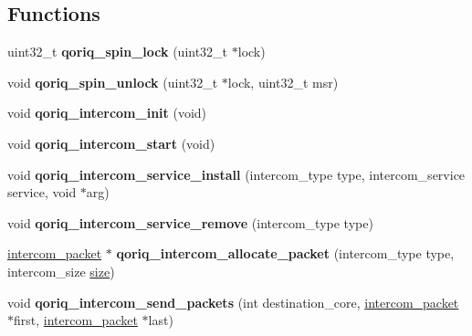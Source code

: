 \subsection*{Functions}
\begin{DoxyCompactItemize}
\item 
\mbox{\label{group__QorIQInterCom_ga1af84b5af84687eb679726fc4b89166a}} 
uint32\+\_\+t {\bfseries qoriq\+\_\+spin\+\_\+lock} (uint32\+\_\+t $\ast$lock)
\item 
\mbox{\label{group__QorIQInterCom_ga86c1e181120f331ec91fd7d7ebd5f613}} 
void {\bfseries qoriq\+\_\+spin\+\_\+unlock} (uint32\+\_\+t $\ast$lock, uint32\+\_\+t msr)
\item 
\mbox{\label{group__QorIQInterCom_ga2905c6a6aea938aab6dd83d9721a123b}} 
void {\bfseries qoriq\+\_\+intercom\+\_\+init} (void)
\item 
\mbox{\label{group__QorIQInterCom_ga5ba6d1c5d0dd9bcd7695631bacdf4d2b}} 
void {\bfseries qoriq\+\_\+intercom\+\_\+start} (void)
\item 
\mbox{\label{group__QorIQInterCom_gad63549ab6cd132cca42d363f2936dc1f}} 
void {\bfseries qoriq\+\_\+intercom\+\_\+service\+\_\+install} (intercom\+\_\+type type, intercom\+\_\+service service, void $\ast$arg)
\item 
\mbox{\label{group__QorIQInterCom_gade8a3448f8e04efd239ae6b0fb8a6d6d}} 
void {\bfseries qoriq\+\_\+intercom\+\_\+service\+\_\+remove} (intercom\+\_\+type type)
\item 
\mbox{\label{group__QorIQInterCom_gad6c531528c59dcc180b04723079acd6b}} 
\mbox{\hyperlink{structintercom__packet}{intercom\+\_\+packet}} $\ast$ {\bfseries qoriq\+\_\+intercom\+\_\+allocate\+\_\+packet} (intercom\+\_\+type type, intercom\+\_\+size \mbox{\hyperlink{sun4u_2tte_8h_a245260f6f74972558f61b85227df5aae}{size}})
\item 
\mbox{\label{group__QorIQInterCom_ga73ccc74a1cac284f1b7d162d01eba12a}} 
void {\bfseries qoriq\+\_\+intercom\+\_\+send\+\_\+packets} (int destination\+\_\+core, \mbox{\hyperlink{structintercom__packet}{intercom\+\_\+packet}} $\ast$first, \mbox{\hyperlink{structintercom__packet}{intercom\+\_\+packet}} $\ast$last)

\end{DoxyCompactItemize}

